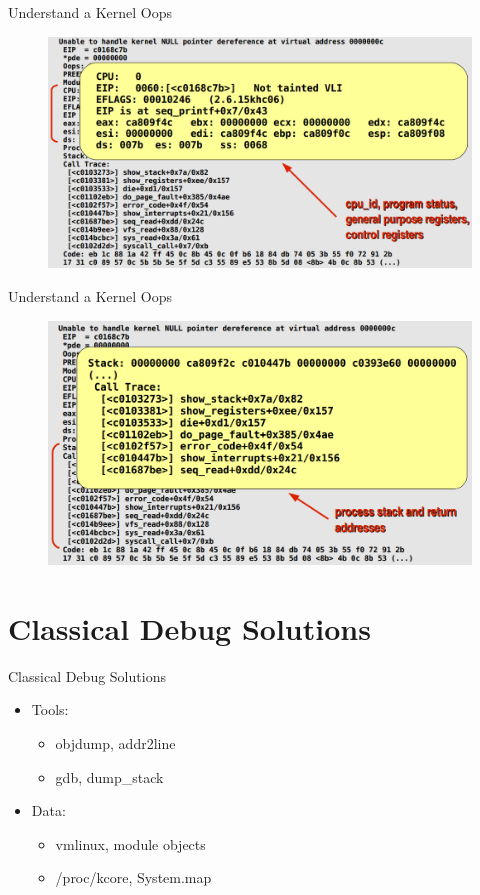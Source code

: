 \documentclass{workshop}
\begin{document}
\begin{frame}{Understand a Kernel Oops}
\begin{figure}
  \includegraphics[scale=0.3]{img/5.png}
  \end{figure}
\end{frame}

\begin{frame}{Understand a Kernel Oops}
\begin{figure}
  \includegraphics[scale=0.3]{img/6.png}
  \end{figure}
\end{frame}

\section{Classical Debug Solutions}
\begin{frame}{Classical Debug Solutions}
\begin{itemize}
\item Tools:
\begin{itemize}
\item objdump, addr2line
\item gdb, dump\_stack
\end{itemize}
\item Data:
\begin{itemize}
\item vmlinux, module objects
\item /proc/kcore, System.map
\end{itemize}
\end{itemize}
\end{frame}
\end{document}

